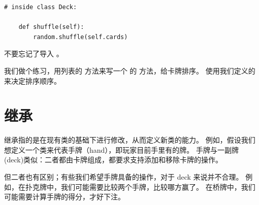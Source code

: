 \begin{lstlisting}
# inside class Deck:

    def shuffle(self):
        random.shuffle(self.cards)
\end{lstlisting}


不要忘记了导入  。


我们做个练习，用列表的  方法来写一个  的  方法，给卡牌排序。
  使用我们定义的  来决定排序顺序。

 


\section{继承}



继承指的是在现有类的基础下进行修改，从而定义新类的能力。  
例如，假设我们想定义一个类来代表手牌（hand），即玩家目前手里有的牌。  
手牌与一副牌 (deck)类似：二者都由卡牌组成，都要求支持添加和移除卡牌的操作。


但二者也有区别；有些我们希望手牌具备的操作，对于 deck 来说并不合理。  
例如，在扑克牌中，我们可能需要比较两个手牌，比较哪方赢了。  
在桥牌中，我们可能需要计算手牌的得分，才好下注。

